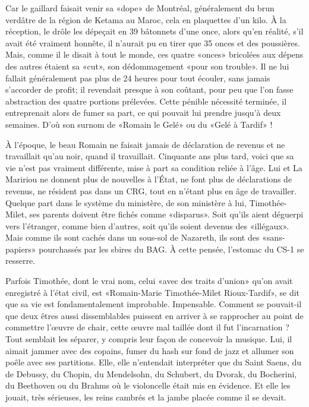 Car le gaillard faisait venir sa «dope» de Montréal, généralement du brun verdâtre de la région de Ketama au Maroc, cela en plaquettes d’un kilo. À la réception, le drôle les dépeçait en 39 bâtonnets d’une once, alors qu’en réalité, s’il avait été vraiment honnête, il n’aurait pu en tirer que 35 onces et des poussières. Mais, comme il le disait à tout le monde, ces quatre «onces» bricolées aux dépens des autres étaient sa «cut», son dédommagement «pour son trouble». Il ne lui fallait généralement pas plus de 24 heures pour tout écouler, sans jamais s’accorder de profit; il revendait presque à son coûtant, pour peu que l’on fasse abstraction des quatre portions prélevées. Cette pénible nécessité terminée, il entreprenait alors de fumer sa part, ce qui pouvait lui prendre jusqu’à deux semaines. D’où son surnom de «Romain le Gelé» ou du «Gelé à Tardif» !

À l’époque, le beau Romain ne faisait jamais de déclaration de revenus et ne travaillait qu’au noir, quand il travaillait. Cinquante ans plus tard, voici que sa vie n’est pas vraiment différente, mise à part sa condition reliée à l’âge. Lui et La Maririou ne donnent plus de nouvelles à l’État, ne font plus de déclarations de revenus, ne résident pas dans un CRG, tout en n’étant plus en âge de travailler. Quelque part dans le système du ministère, de son ministère à lui, Timothée-Milet, ses parents doivent être fichés comme «disparus». Soit qu’ils aient déguerpi vers l’étranger, comme bien d’autres, soit qu’ils soient devenus des «illégaux». Mais comme ils sont cachés dans un sous-sol de Nazareth, ils sont des «sans-papiers» pourchassés par les sbires du BAG. À cette pensée, l’estomac du CS-1 se resserre.

Parfois Timothée, dont le vrai nom, celui «avec des traits d’union» qu’on avait enregistré à l’état civil, est «Romain-Marie Timothée-Milet Rioux-Tardif», se dit que sa vie est fondamentalement improbable. Impensable. Comment se pouvait-il que deux êtres aussi dissemblables puissent en arriver à se rapprocher au point de commettre l’œuvre de chair, cette œuvre mal taillée dont il fut l’incarnation ? Tout semblait les séparer, y compris leur façon de concevoir la musique. Lui, il aimait jammer avec des copains, fumer du hash sur fond de jazz et allumer son poêle avec ses partitions. Elle, elle n’entendait interpréter que du Saint Saens, du de Debussy, du Chopin, du Mendelsohn, du Schubert, du Dvorak, du Bocherini, du Beethoven ou du Brahms où le violoncelle était mis en évidence. Et elle les jouait, très sérieuses, les reins cambrés et la jambe placée comme il se devait.

